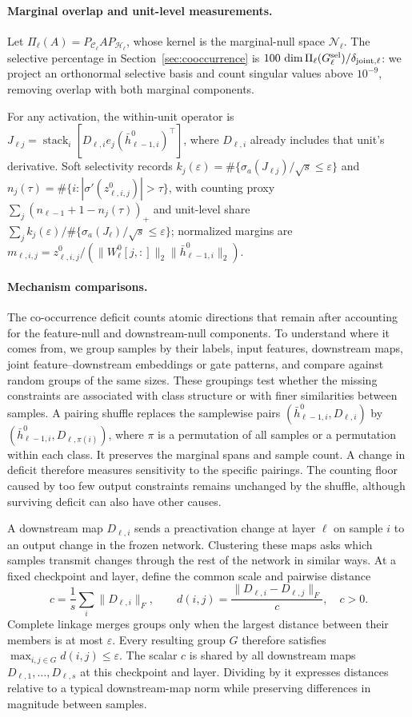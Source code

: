 \paragraph{Marginal overlap and unit-level measurements.}
Let $\Pi_\ell(A)=P_{\mathcal C_\ell}AP_{\mathcal H_\ell}$, whose kernel is the marginal-null space $\mathcal N_\ell$. The selective percentage in Section~\ref{sec:cooccurrence} is $100\,\dim\Pi_\ell(G_\ell^{\rm sel})/\delta_{\rm joint,\ell}$: we project an orthonormal selective basis and count singular values above $10^{-9}$, removing overlap with both marginal components.

For any activation, the within-unit operator is $J_{\ell j}=\operatorname{stack}_i[D_{\ell,i}e_j(\bar h_{\ell-1,i}^0)^\top]$, where $D_{\ell,i}$ already includes that unit's derivative. Soft selectivity records $k_j(\varepsilon)=\#\{\sigma_a(J_{\ell j})/\sqrt{s}\le\varepsilon\}$ and $n_j(\tau)=\#\{i:|\sigma'(z_{\ell,i,j}^0)|>\tau\}$, with counting proxy $\sum_j(n_{\ell-1}+1-n_j(\tau))_+$ and unit-level share $\sum_j k_j(\varepsilon)/\#\{\sigma_a(J_\ell)/\sqrt{s}\le\varepsilon\}$; normalized margins are $m_{\ell,i,j}=z_{\ell,i,j}^0/(\|W_\ell^0[j,:]\|_2\|\bar h_{\ell-1,i}^0\|_2)$.

\paragraph{Mechanism comparisons.}
The co-occurrence deficit counts atomic directions that remain after accounting for the feature-null and downstream-null components. To understand where it comes from, we group samples by their labels, input features, downstream maps, joint feature--downstream embeddings or gate patterns, and compare against random groups of the same sizes. These groupings test whether the missing constraints are associated with class structure or with finer similarities between samples. A pairing shuffle replaces the samplewise pairs $(\bar h_{\ell-1,i}^0,D_{\ell,i})$ by $(\bar h_{\ell-1,i}^0,D_{\ell,\pi(i)})$, where $\pi$ is a permutation of all samples or a permutation within each class. It preserves the marginal spans and sample count. A change in deficit therefore measures sensitivity to the specific pairings. The counting floor caused by too few output constraints remains unchanged by the shuffle, although surviving deficit can also have other causes.

A downstream map $D_{\ell,i}$ sends a preactivation change at layer $\ell$ on sample $i$ to an output change in the frozen network. Clustering these maps asks which samples transmit changes through the rest of the network in similar ways. At a fixed checkpoint and layer, define the common scale and pairwise distance
\[
 c=\frac1s\sum_i\|D_{\ell,i}\|_F,\qquad
 d(i,j)=\frac{\|D_{\ell,i}-D_{\ell,j}\|_F}{c},\quad c>0.
\]
Complete linkage merges groups only when the largest distance between their members is at most $\varepsilon$. Every resulting group $G$ therefore satisfies $\max_{i,j\in G}d(i,j)\le\varepsilon$. The scalar $c$ is shared by all downstream maps $D_{\ell,1},\ldots,D_{\ell,s}$ at this checkpoint and layer. Dividing by it expresses distances relative to a typical downstream-map norm while preserving differences in magnitude between samples.

